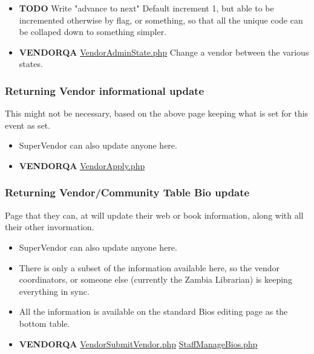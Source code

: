 \documentclass[captions=tablesignature]{scrartcl}
\begin{document}
\begin{itemize}
\item {\bfseries\sffamily TODO} Write "advance to next"
\label{sec-3-1-5-14}
Default increment 1, but able to be incremented otherwise by
flag, or something, so that all the unique code can be collaped
down to something simpler.

\item {\bfseries\sffamily VENDORQA} \href{../webpages/VendorAdminState.php}{VendorAdminState.php}
\label{sec-3-1-5-15}
Change a vendor between the various states.
\end{itemize}

\subsubsection{Returning Vendor informational update}
\label{sec-3-1-6}
This might not be necessary, based on the above page keeping what
is set for this event as set.
\begin{itemize}
\item SuperVendor can also update anyone here.
\end{itemize}
\begin{itemize}
\item {\bfseries\sffamily VENDORQA} \href{../webpages/VendorApply.php}{VendorApply.php}
\label{sec-3-1-6-1}
\end{itemize}

\subsubsection{Returning Vendor/Community Table Bio update}
\label{sec-3-1-7}
Page that they can, at will update their web or book information,
along with all their other invormation.
\begin{itemize}
\item SuperVendor can also update anyone here.
\item There is only a subset of the information available here, so
the vendor coordinators, or someone else (currently the Zambia
Librarian) is keeping everything in sync.
\item All the information is available on the standard Bios editing
page as the bottom table.
\end{itemize}
\begin{itemize}
\item {\bfseries\sffamily VENDORQA} \href{../webpages/VendorSubmitVendor.php}{VendorSubmitVendor.php} \href{../webpages/StaffManageBios.php}{StaffManageBios.php}
\label{sec-3-1-7-1}
\end{itemize}
\end{document}
